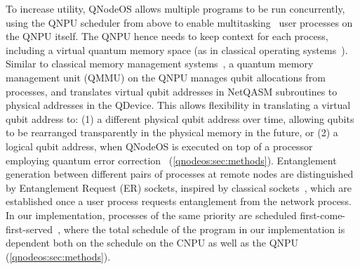 To increase utility, QNodeOS allows multiple programs to be run concurrently, using the QNPU scheduler from above to enable multitasking~\cite{mccullough_design_1965-1,dennis_segmentation_1965} user processes on the QNPU itself.
The QNPU hence needs to keep context for each process, including a virtual quantum memory space (as in classical operating systems~\cite{daley_virtual_1968-1}).
Similar to classical memory management systems~\cite{peterson_operating_1985}, a quantum memory management unit (QMMU) on the QNPU manages qubit allocations from processes, and translates virtual qubit addresses in NetQASM subroutines to physical addresses in the QDevice.
This allows flexibility in translating a virtual qubit address to: (1) a different physical qubit address over time, allowing qubits to be rearranged transparently in the physical memory in the future, or (2) a logical qubit address, when QNodeOS is executed on top of a processor employing quantum error correction~\cite{lidar2013quantum} (\cref{qnodeos:sec:methods}).
Entanglement generation between different pairs of processes at remote nodes are distinguished by Entanglement Request (ER) sockets, inspired by classical sockets~\cite{chesson_network_1975-1,leach_architecture_1983}, which are established once a user process requests entanglement from the network process.
In our implementation, processes of the same priority are scheduled first-come-first-served~\cite{peterson_operating_1985}, where the total schedule of the program in our implementation is dependent both on the schedule on the CNPU as well as the QNPU (\cref{qnodeos:sec:methods}).

